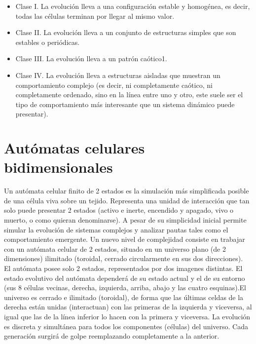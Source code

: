 \documentclass[a4paper,12pt]{article}
\begin{document}
\begin{itemize}
  \item Clase I. La evolución lleva a una configuración estable y homogénea, es decir, todas las células terminan por llegar al mismo valor.
  \item Clase II. La evolución lleva a un conjunto de estructuras simples que son estables o periódicas.
  \item Clase III. La evolución lleva a un patrón caótico1.
  \item Clase IV. La evolución lleva a estructuras aisladas que muestran un comportamiento complejo (es decir, ni completamente caótico, ni completamente ordenado, sino en la línea entre uno y otro, este suele ser el tipo de comportamiento más interesante que un sistema dinámico puede presentar).
\end{itemize}

\section{Autómatas celulares bidimensionales}

    Un autómata celular finito de 2 estados es la simulación más simplificada posible de una célula viva sobre un tejido. Representa una unidad de interacción que tan solo puede presentar 2 estados (activo e inerte, encendido y apagado, vivo o muerto, o como quieran denominarse). A pesar de su simplicidad inicial permite simular la evolución de sistemas complejos y analizar pautas tales como el comportamiento emergente.
    Un nuevo nivel de complejidad consiste en trabajar con un autómata celular de 2 estados, situado en un universo plano (de 2 dimensiones) ilimitado (toroidal, cerrado circularmente en sus dos direcciones).\\
    
    
El autómata posee solo 2 estados, representados por dos imagenes distintas. El estado evolutivo del autómata dependerá de su estado actual y el de su entorno (sus 8 células vecinas, derecha, izquierda, arriba, abajo y las cuatro esquinas).El universo es cerrado e ilimitado (toroidal), de forma que las últimas celdas de la derecha están unidas (interactuan) con las primeras de la izquierda y viceversa, al igual que las de la línea inferior lo hacen con la primera y viceversa. La evolución es discreta y simultánea para todos los componentes (células) del universo. Cada generación surgirá de golpe reemplazando completamente a la anterior.

\clearpage
\end{document}
